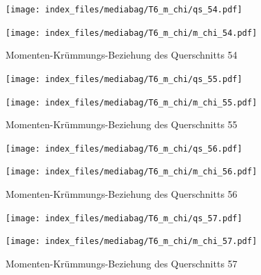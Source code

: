 \documentclass[
  11pt,
  letterpaper,
]{scrreprt}
\begin{document}
\begin{figure}[H]

\begin{minipage}{0.50\linewidth}
\texttt{[image: index\_files/mediabag/T6\_m\_chi/qs\_54.pdf]}\end{minipage}%
%
\begin{minipage}{0.50\linewidth}
\texttt{[image: index\_files/mediabag/T6\_m\_chi/m\_chi\_54.pdf]}\end{minipage}%

\caption{\label{fig-mchi_anhang}Momenten-Krümmungs-Beziehung des
Querschnitts 54}

\end{figure}%

\begin{figure}[H]

\begin{minipage}{0.50\linewidth}
\texttt{[image: index\_files/mediabag/T6\_m\_chi/qs\_55.pdf]}\end{minipage}%
%
\begin{minipage}{0.50\linewidth}
\texttt{[image: index\_files/mediabag/T6\_m\_chi/m\_chi\_55.pdf]}\end{minipage}%

\caption{\label{fig-mchi_anhang}Momenten-Krümmungs-Beziehung des
Querschnitts 55}

\end{figure}%

\begin{figure}[H]

\begin{minipage}{0.50\linewidth}
\texttt{[image: index\_files/mediabag/T6\_m\_chi/qs\_56.pdf]}\end{minipage}%
%
\begin{minipage}{0.50\linewidth}
\texttt{[image: index\_files/mediabag/T6\_m\_chi/m\_chi\_56.pdf]}\end{minipage}%

\caption{\label{fig-mchi_anhang}Momenten-Krümmungs-Beziehung des
Querschnitts 56}

\end{figure}%

\begin{figure}[H]

\begin{minipage}{0.50\linewidth}
\texttt{[image: index\_files/mediabag/T6\_m\_chi/qs\_57.pdf]}\end{minipage}%
%
\begin{minipage}{0.50\linewidth}
\texttt{[image: index\_files/mediabag/T6\_m\_chi/m\_chi\_57.pdf]}\end{minipage}%

\caption{\label{fig-mchi_anhang}Momenten-Krümmungs-Beziehung des
Querschnitts 57}

\end{figure}%
\end{document}
